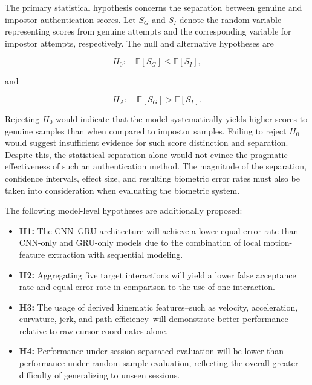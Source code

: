 \documentclass[conference]{IEEEtran}
\begin{document}
The primary statistical hypothesis concerns the separation between genuine and impostor authentication scores. Let $S_G$ and $S_I$ denote the random variable representing scores from genuine attempts and the corresponding variable for impostor attempts, respectively. The null and alternative hypotheses are 

\begin{equation}
H_0:\quad
\mathbb{E}[S_G]
\leq
\mathbb{E}[S_I],
\label{eq:null_hypothesis}
\end{equation}

and

\begin{equation}
H_A:\quad
\mathbb{E}[S_G]
>
\mathbb{E}[S_I].
\label{eq:alternative_hypothesis}
\end{equation}

Rejecting $H_0$ would indicate that the model systematically yields higher scores to genuine samples than when compared to impostor samples. Failing to reject $H_0$ would suggest insufficient evidence for such score distinction and separation. Despite this, the statistical separation alone would not evince the pragmatic effectiveness of such an authentication method. The magnitude of the separation, confidence intervals, effect size, and resulting biometric error rates must also be taken into consideration when evaluating the biometric system. 

The following model-level hypotheses are additionally proposed:

\begin{itemize}
\item \textbf{H1:} The CNN--GRU architecture will achieve a lower equal error rate than CNN-only and GRU-only models due to the combination of local motion-feature extraction with sequential modeling. 

\item \textbf{H2:} Aggregating five target interactions will yield a lower false acceptance rate and equal error rate in comparison to the use of one interaction. 

\item \textbf{H3:} The usage of derived kinematic features--such as velocity, acceleration, curvature, jerk, and path efficiency--will demonstrate better performance relative to raw cursor coordinates alone. 

\item \textbf{H4:} Performance under session-separated evaluation will be lower than performance under random-sample evaluation, reflecting the overall greater difficulty of generalizing to unseen sessions.
\end{itemize}
\end{document}
